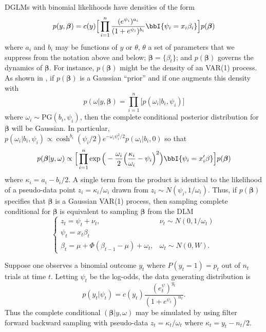 \documentclass[11pt]{article}
\newcommand{\PG}{\text{PG}}
\newcommand{\bbeta}{\boldsymbol{\beta}}
\begin{document}
DGLMs with binomial likelihoods have densities of the form
\[
p(y, \bbeta) = c(y) \Big[ \prod_{i=1}^n
\frac{(e^{\psi_i})^{a_i}}{(1+e^{\psi_i})^{b_i}} \bbI \{\psi_i = x_i \beta_i\}
\Big] p(\bbeta)
\]
where $a_i$ and $b_i$ may be functions of $y$ or $\theta$, $\theta$ a set of
parameters that we suppress from the notation above and below; $\bbeta =
\{\beta_t\}$; and $p(\bbeta)$ governs the dynamics of $\bbeta$.  For instance,
$p(\bbeta)$ might be the density of an VAR(1) process.  As shown in
\cite{polson-etal-2012}, if $p(\bbeta)$ is a Gaussian ``prior'' and if one
augments this density with
\begin{equation}
\label{eqn:augmentation}
p(\omega | y, \bbeta) = \prod_{i=1}^n \Big[ p(\omega_i | b_i, \psi_i)
\Big]
\end{equation}
where $\omega_i \sim \PG(b_i, \psi_i)$, then the complete conditional posterior
distribution for $\bbeta$ will be Gaussian.  In particular, $p(\omega_i | b_i,
\psi_i) \propto \cosh^{b_i}(\psi_i/2) e^{-\omega_i \psi_i^2 / 2} p(\omega_i |
b_i, 0)$ so that
\[
p(\bbeta | y, \omega) 
\propto 
\Big[ \prod_{i=1}^n \exp 
\Big(-\frac{\omega_i}{2} \Big(\frac{\kappa_i}{\omega_i} - \psi_i\Big)^2 \Big)
\bbI \{\psi_i = x_i' \beta\} \Big] p(\bbeta)
\]
where $\kappa_i = a_i - b_i / 2$.  A single term from the product is identical
to the likelihood of a pseudo-data point $z_i = \kappa_i / \omega_i$ drawn from
$z_i \sim N(\psi_i, 1/\omega_i)$.  Thus, if $p(\bbeta)$ specifies that $\bbeta$
is a Gaussian VAR(1) process, then sampling complete conditional for $\bbeta$ is
equivalent to sampling $\bbeta$ from the DLM
\[
\begin{cases}
z_t = \psi_t + \nu_t, & \nu_t \sim N(0, 1/\omega_t) \\
\psi_t = x_t \beta_t \\
\beta_t = \mu + \Phi (\beta_{t-1} - \mu) + \omega_t, & \omega_t \sim N(0, W).
\end{cases}
\]

\begin{example}
Suppose one observes a binomial outcome $y_t$ where $P(y_t = 1) = p_t$ out of
$n_t$ trials at time $t$.  Letting $\psi_t$ be the log-odds, the data generating
distribution is
\[
p(y_t | \psi_t) = c(y_t) \frac{(e^\psi_t)^{y_t}}{(1+e^{\psi_t})^{n_t}}.
\]
Thus the complete conditional $(\bbeta | y, \omega)$ may be simulated by using
filter forward backward sampling with pseudo-data $z_t = \kappa_t / \omega_t$
where $\kappa_t = y_t - n_t / 2$.
\end{example}
\end{document}
